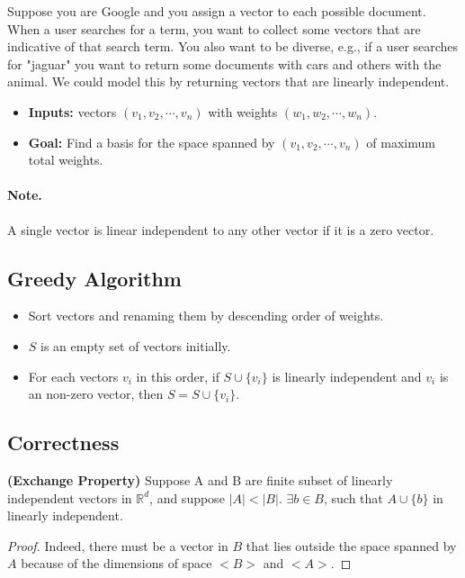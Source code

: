 Suppose you are Google and you assign a vector to each possible document. When
a user searches for a term, you want to collect some vectors that are indicative of that search term. You also want to be diverse, e.g., if a user searches for "jaguar" you want to return some documents with cars and others with the animal. We could model this by returning vectors that are linearly independent.

\begin{itemize}
	\item \textbf{Inputs:} vectors $(v_1, v_2, \cdots, v_n)$ with weights 
$(w_1, w_2, \cdots, w_n)$.
    \item \textbf{Goal:} Find a basis for the space spanned by $(v_1, v_2, \cdots, 
v_n)$ of maximum total weights.
\end{itemize}
\paragraph{Note.} A single vector is linear independent to any other vector if 
it is a zero vector.

\subsection{Greedy Algorithm}
\begin{itemize}
	\item Sort vectors and renaming them by descending order of weights.
	\item $S$ is an empty set of vectors initially.
	\item For each vectors $v_i$ in this order, if $S \cup \{v_i\}$ is linearly 
independent and $v_i$ is an non-zero vector, then $S = S \cup \{v_i\}$.
\end{itemize}

\subsection{Correctness}
\begin{theorem}
	\textbf{(Exchange Property)} Suppose A and B are finite subset of linearly independent vectors in $ \mathbb{R}^d $, and suppose $ |A| < |B| $. $\exists b \in B$, such that $ A \cup \{b\} $ in linearly independent.
\end{theorem}

\begin{proof}
	Indeed, there must be a vector in $ B $ that lies outside the space spanned by $ A $ because of the dimensions of space $ <B> $ and $ <A> $.
\end{proof}


